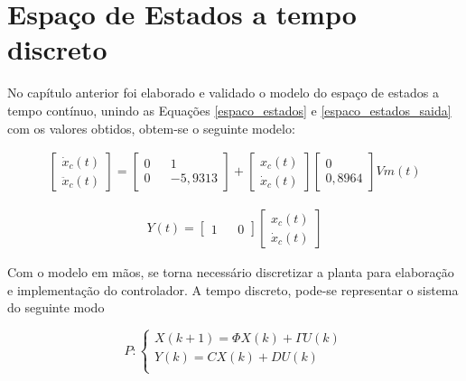 \section{Espaço de Estados a tempo discreto}

No capítulo anterior foi elaborado e validado o modelo do espaço de estados a tempo contínuo, unindo as Equações \ref{espaco_estados} e \ref{espaco_estados_saida} com os valores obtidos, obtem-se o seguinte modelo:

\begin{gather}
    \begin{bmatrix}
        \dot{x}_c(t) \\ \ddot{x}_c(t)
    \end{bmatrix}=
    \begin{bmatrix}
        0 && 1 \\ 0 && -5,9313
    \end{bmatrix}
    +
    \begin{bmatrix}
        x_c(t) \\ \dot{x}_c(t)
    \end{bmatrix}
    \begin{bmatrix}
        0 \\ 0,8964
    \end{bmatrix}
    Vm(t)
    \label{espaco_estados1}
\end{gather}

\begin{gather}
    Y(t)=
    \begin{bmatrix}
        1 && 0
    \end{bmatrix}
    \begin{bmatrix}
        x_c(t) \\ \dot{x}_c(t)
    \end{bmatrix}
    \label{espaco_estados_saida1}
\end{gather}

Com o modelo em mãos, se torna necessário discretizar a planta para elaboração e implementação do controlador. A tempo discreto, pode-se representar o sistema do seguinte modo

\begin{equation}
    P :\begin{cases} 
        X(k+1) = \Phi X(k) + \varGamma U(k) \\
        Y(k) = CX(k) + DU(k) \\
        \end{cases}
    \label{modelo_espaco_estados_discreto}
\end{equation}

